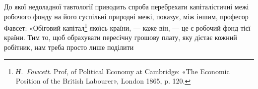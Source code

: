 До якої недоладної тавтології приводить спроба перебрехати
капіталістичні межі робочого фонду на його суспільні
природні межі, показує, між іншим, професор Фавсет: «Обіговий
капітал\footnote{
\emph{Н.~Fawcett}. Prof, of Political Economy at Cambridge: «The Economic
Position of the British Labourer», London 1865, p. 120.
} якоїсь країни, — каже він, — це є робочий фонд
тієї країни. Тим то, щоб обрахувати пересічну грошову плату,
яку дістає кожний робітник, нам треба просто лише поділити
\parbreak{}  %
